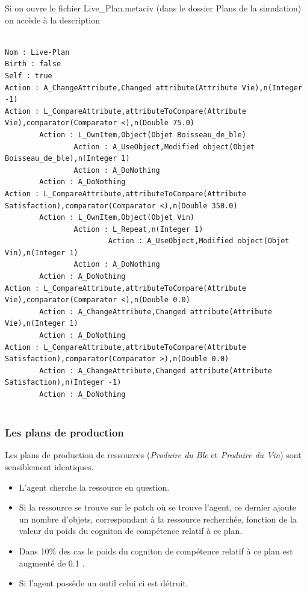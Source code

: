\documentclass[a4paper,oneside,12 pt]{article}
\begin{document}
Si on ouvre le fichier Live\_Plan.metaciv (dans le dossier Plans de la simulation) on accède à la description
	\begin{verbatim}

Nom : Live-Plan
Birth : false   
Self : true
Action : A_ChangeAttribute,Changed attribute(Attribute Vie),n(Integer -1)
Action : L_CompareAttribute,attributeToCompare(Attribute Vie),comparator(Comparator <),n(Double 75.0)
		Action : L_OwnItem,Object(Objet Boisseau_de_ble)
				Action : A_UseObject,Modified object(Objet Boisseau_de_ble),n(Integer 1)
				Action : A_DoNothing
		Action : A_DoNothing
Action : L_CompareAttribute,attributeToCompare(Attribute Satisfaction),comparator(Comparator <),n(Double 350.0)
		Action : L_OwnItem,Object(Objet Vin)
				Action : L_Repeat,n(Integer 1)
						Action : A_UseObject,Modified object(Objet Vin),n(Integer 1)
				Action : A_DoNothing
		Action : A_DoNothing
Action : L_CompareAttribute,attributeToCompare(Attribute Vie),comparator(Comparator <),n(Double 0.0)
		Action : A_ChangeAttribute,Changed attribute(Attribute Vie),n(Integer 1)
		Action : A_DoNothing
Action : L_CompareAttribute,attributeToCompare(Attribute Satisfaction),comparator(Comparator >),n(Double 0.0)
		Action : A_ChangeAttribute,Changed attribute(Attribute Satisfaction),n(Integer -1)
		Action : A_DoNothing
	
	\end{verbatim}	

\subsubsection{Les plans de production}
	Les plans de production de ressources (\textit{Produire du Ble} et \textit{Produire du Vin}) sont sensiblement identiques.
	
\begin{itemize}
\item L'agent cherche la ressource en question.
\item Si la ressource se trouve sur le patch où se trouve l'agent, ce dernier ajoute un nombre d'objets, correspondant à la ressource recherchée, fonction de la valeur du poids du cogniton de compétence relatif à ce plan.
\item Dans 10\% des cas le poids du cogniton de compétence relatif à ce plan est augmenté de 0.1 .
\item Si l'agent possède un outil celui ci est détruit.

\end{itemize}
\end{document}
